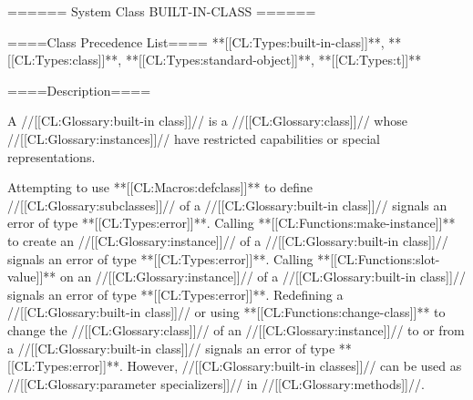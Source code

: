 ====== System Class BUILT-IN-CLASS ======

====Class Precedence List==== **[[CL:Types:built-in-class]]**, **[[CL:Types:class]]**, **[[CL:Types:standard-object]]**, **[[CL:Types:t]]**

====Description====

A //[[CL:Glossary:built-in class]]// is a //[[CL:Glossary:class]]// whose //[[CL:Glossary:instances]]// have restricted capabilities or special representations.

Attempting to use **[[CL:Macros:defclass]]** to define //[[CL:Glossary:subclasses]]// of a //[[CL:Glossary:built-in class]]// signals an error of type **[[CL:Types:error]]**. Calling **[[CL:Functions:make-instance]]** to create an //[[CL:Glossary:instance]]// of a //[[CL:Glossary:built-in class]]// signals an error of type **[[CL:Types:error]]**. Calling **[[CL:Functions:slot-value]]** on an //[[CL:Glossary:instance]]// of a //[[CL:Glossary:built-in class]]// signals an error of type **[[CL:Types:error]]**. Redefining a //[[CL:Glossary:built-in class]]// or using **[[CL:Functions:change-class]]** to change the //[[CL:Glossary:class]]// of an //[[CL:Glossary:instance]]// to or from a //[[CL:Glossary:built-in class]]// signals an error of type **[[CL:Types:error]]**. However, //[[CL:Glossary:built-in classes]]// can be used as //[[CL:Glossary:parameter specializers]]// in //[[CL:Glossary:methods]]//.

